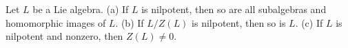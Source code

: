 Let $L$ be a Lie algebra.
(a) If $L$ is nilpotent, then so are all subalgebras and homomorphic images of $L$.
(b) If $L/Z(L)$ is nilpotent, then so is $L$.
(c) If $L$ is nilpotent and nonzero, then $Z(L) \neq 0$.
